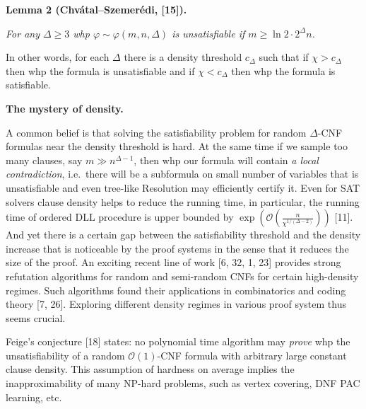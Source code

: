 \documentclass[10pt,a4paper]{article}
\begin{document}


\par\medskip\noindent\textbf{
\textbf{Lemma 2}\textbf{ }(Chvátal–Szemerédi, [15])\textbf{.}
}\par



\emph{For any $\Delta\geq 3$ whp $\varphi\sim\varphi(m,n,\Delta)$ is unsatisfiable if $m\geq\ln 2\cdot 2^{\Delta}n$.}\par






In other words, for each $\Delta$ there is a density threshold $c_{\Delta}$ such that if $\chi>c_{\Delta}$ then whp the formula is unsatisfiable and if $\chi<c_{\Delta}$ then whp the formula is
satisfiable.\par




\par\medskip\noindent\textbf{The mystery of density.}\par




A common belief is that solving the satisfiability problem for random $\Delta$-CNF formulas
near the density threshold is hard. At the same time if we sample too many clauses, say
$m\gg n^{\Delta-1}$, then whp our formula will contain \emph{a local contradiction}, i.e. there will
be a subformula on small number of variables that is unsatisfiable and even tree-like Resolution
may efficiently certify it. Even for SAT solvers clause density helps to reduce the running time, in
particular, the running time of ordered $\mathrm{DLL}$ procedure is upper bounded by
$\exp\left(\mathcal{O}\left(\frac{n}{\chi^{1/(\Delta-2)}}\right)\right)$ [11]. And yet there is
a certain gap between the satisfiability threshold and the density increase that is noticeable by the
proof systems in the sense that it reduces the size of the proof. An exciting recent line of work
[6, 32, 1, 23] provides strong refutation algorithms for
random and semi-random CNFs for certain
high-density regimes. Such algorithms found their applications in combinatorics and coding theory
[7, 26]. Exploring different density regimes in various proof system thus seems
crucial.\par




Feige’s conjecture [18] states: no polynomial time algorithm may \emph{prove} whp the
unsatisfiability of a random $\mathcal{O}\left(1\right)$-CNF formula with arbitrary large constant clause density. This
assumption of hardness on average implies the inapproximability of many NP-hard problems, such as vertex
covering, DNF PAC learning, etc.\par
\end{document}
